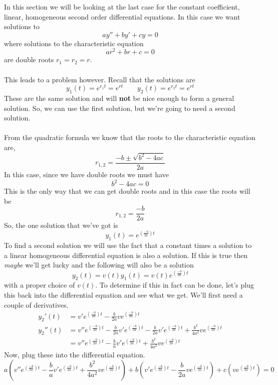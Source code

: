 \documentclass[10pt,reqno]{book}
\theoremstyle{definition}
\begin{document}
	In this section we will be looking at the last case for the constant coefficient, linear, homogeneous second order differential equations.  In this case we want solutions to
	\[ ay'' + by' + cy = 0 \]
	where solutions to the characteristic equation
	\[ ar^2 + br + c = 0 \]
	are double roots $ r_1 = r_2 = r $.\\ \\
	This leads to a problem however.  Recall that the solutions are
	\[ y_1(t) = e^{r_1 t} = e^{rt} \qquad y_2(t) = e^{r_2 t} = e^{rt} \]
	These are the same solution and will \textbf{not} be nice enough to form a general solution. So, we can use the first solution, but we're going to need a second solution.\\ \\
	From the quadratic formula we know that the roots to the characteristic equation are,
	\[ r_{1,2} = \frac{-b \pm \sqrt{b^2 - 4ac}}{2a} \]
	In this case, since we have double roots we must have
	\[ b^2 - 4ac = 0 \]
	This is the only way that we can get double roots and in this case the roots will be
	\[ r_{1,2} = \frac{-b}{2a} \]
	So, the one solution that we've got is
	\[ y_1(t) = e^{\left(\frac{-b}{2a}\right)t} \]
	To find a second solution we will use the fact that a constant times a solution to a linear homogeneous differential equation is also a solution. If this is true then \textit{maybe} we'll get lucky and the following will also be a solution
	\begin{equation}
		y_2(t) = v(t)y_1(t) = v(t)e^{\left(\frac{-b}{2a}\right)t}
	\end{equation}
	with a proper choice of $ v(t) $.  To determine if this in fact can be done, let’s plug this back into the differential equation and see what we get.  We'll first need a couple of derivatives.
	\begin{align*}
		y_2'(t) &= v' e^{\left(\frac{-b}{2a}\right)t} - \frac{b}{2a} v e^{\left(\frac{-b}{2a}\right)t} \\
		y_2''(t) &= v'' e^{\left(\frac{-b}{2a}\right)t} - \frac{b}{2a} v' e^{\left(\frac{-b}{2a}\right)t} - \frac{b}{2a} v' e^{\left(\frac{-b}{2a}\right)t} + \frac{b^2}{4a^2} v e^{\left(\frac{-b}{2a}\right)t}\\
		&= v'' e^{\left(\frac{-b}{2a}\right)t} - \frac{b}{a} v' e^{\left(\frac{-b}{2a}\right)t} + \frac{b^2}{4a^2} v e^{\left(\frac{-b}{2a}\right)t}
	\end{align*}
	Now, plug these into the differential equation.
	\[ a\left( v'' e^{\left(\frac{-b}{2a}\right)t} - \frac{b}{a} v' e^{\left(\frac{-b}{2a}\right)t} + \frac{b^2}{4a^2} v e^{\left(\frac{-b}{2a}\right)t} \right) + b\left( v' e^{\left(\frac{-b}{2a}\right)t} - \frac{b}{2a} v e^{\left(\frac{-b}{2a}\right)t} \right) + c \left( v e^{\left(\frac{-b}{2a}\right)t} \right) = 0 \]
\end{document}
